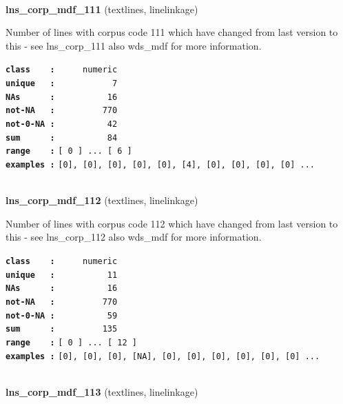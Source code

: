 \documentclass[]{article}
\begin{document}
~

\textbf{lns\_corp\_mdf\_111} (textlines, linelinkage)

Number of lines with corpus code 111 which have changed from last
version to this - see lns\_corp\_111 also wds\_mdf for more information.

\textbf{\texttt{class\ \ \ \ :}} \texttt{~~~~~numeric}\\
\textbf{\texttt{unique\ \ \ :}} \texttt{~~~~~~~~~~~7}\\
\textbf{\texttt{NAs\ \ \ \ \ \ :}} \texttt{~~~~~~~~~~16}\\
\textbf{\texttt{not-NA\ \ \ :}} \texttt{~~~~~~~~~770}\\
\textbf{\texttt{not-0-NA\ :}} \texttt{~~~~~~~~~~42}\\
\textbf{\texttt{sum\ \ \ \ \ \ :}} \texttt{~~~~~~~~~~84}\\
\textbf{\texttt{range\ \ \ \ :}}
\texttt{{[}\ 0\ {]}\ ...\ {[}\ 6\ {]}}\\
\textbf{\texttt{examples\ :}}
\texttt{{[}0{]},\ {[}0{]},\ {[}0{]},\ {[}0{]},\ {[}0{]},\ {[}4{]},\ {[}0{]},\ {[}0{]},\ {[}0{]},\ {[}0{]}\ ...}\\

~

\textbf{lns\_corp\_mdf\_112} (textlines, linelinkage)

Number of lines with corpus code 112 which have changed from last
version to this - see lns\_corp\_112 also wds\_mdf for more information.

\textbf{\texttt{class\ \ \ \ :}} \texttt{~~~~~numeric}\\
\textbf{\texttt{unique\ \ \ :}} \texttt{~~~~~~~~~~11}\\
\textbf{\texttt{NAs\ \ \ \ \ \ :}} \texttt{~~~~~~~~~~16}\\
\textbf{\texttt{not-NA\ \ \ :}} \texttt{~~~~~~~~~770}\\
\textbf{\texttt{not-0-NA\ :}} \texttt{~~~~~~~~~~59}\\
\textbf{\texttt{sum\ \ \ \ \ \ :}} \texttt{~~~~~~~~~135}\\
\textbf{\texttt{range\ \ \ \ :}}
\texttt{{[}\ 0\ {]}\ ...\ {[}\ 12\ {]}}\\
\textbf{\texttt{examples\ :}}
\texttt{{[}0{]},\ {[}0{]},\ {[}0{]},\ {[}NA{]},\ {[}0{]},\ {[}0{]},\ {[}0{]},\ {[}0{]},\ {[}0{]},\ {[}0{]}\ ...}\\

~

\textbf{lns\_corp\_mdf\_113} (textlines, linelinkage)
\end{document}
